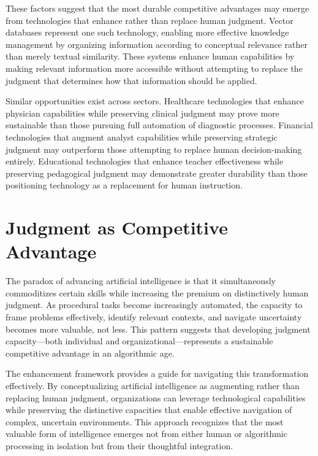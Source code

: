 \documentclass[
  Letterpaper,
]{scrbook}
\begin{document}
These factors suggest that the most durable competitive advantages may
emerge from technologies that enhance rather than replace human
judgment. Vector databases represent one such technology, enabling more
effective knowledge management by organizing information according to
conceptual relevance rather than merely textual similarity. These
systems enhance human capabilities by making relevant information more
accessible without attempting to replace the judgment that determines
how that information should be applied.

Similar opportunities exist across sectors. Healthcare technologies that
enhance physician capabilities while preserving clinical judgment may
prove more sustainable than those pursuing full automation of diagnostic
processes. Financial technologies that augment analyst capabilities
while preserving strategic judgment may outperform those attempting to
replace human decision-making entirely. Educational technologies that
enhance teacher effectiveness while preserving pedagogical judgment may
demonstrate greater durability than those positioning technology as a
replacement for human instruction.

\section{Judgment as Competitive
Advantage}\label{judgment-as-competitive-advantage}

The paradox of advancing artificial intelligence is that it
simultaneously commoditizes certain skills while increasing the premium
on distinctively human judgment. As procedural tasks become increasingly
automated, the capacity to frame problems effectively, identify relevant
contexts, and navigate uncertainty becomes more valuable, not less. This
pattern suggests that developing judgment capacity---both individual and
organizational---represents a sustainable competitive advantage in an
algorithmic age.

The enhancement framework provides a guide for navigating this
transformation effectively. By conceptualizing artificial intelligence
as augmenting rather than replacing human judgment, organizations can
leverage technological capabilities while preserving the distinctive
capacities that enable effective navigation of complex, uncertain
environments. This approach recognizes that the most valuable form of
intelligence emerges not from either human or algorithmic processing in
isolation but from their thoughtful integration.
\end{document}
